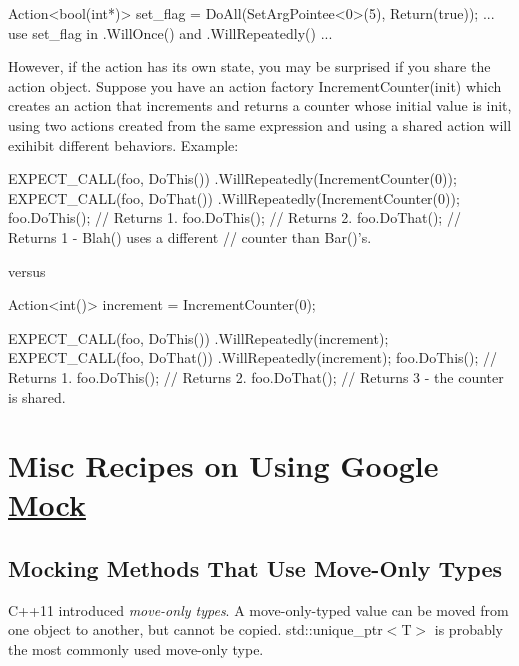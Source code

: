 \begin{DoxyCode}
Action<bool(int*)> set\_flag = DoAll(SetArgPointee<0>(5),
                                    Return(\textcolor{keyword}{true}));
... use set\_flag in .WillOnce() and .WillRepeatedly() ...
\end{DoxyCode}


However, if the action has its own state, you may be surprised if you share the action object. Suppose you have an action factory {\ttfamily Increment\+Counter(init)} which creates an action that increments and returns a counter whose initial value is {\ttfamily init}, using two actions created from the same expression and using a shared action will exihibit different behaviors. Example\+:


\begin{DoxyCode}
EXPECT\_CALL(foo, DoThis())
    .WillRepeatedly(IncrementCounter(0));
EXPECT\_CALL(foo, DoThat())
    .WillRepeatedly(IncrementCounter(0));
foo.DoThis();  \textcolor{comment}{// Returns 1.}
foo.DoThis();  \textcolor{comment}{// Returns 2.}
foo.DoThat();  \textcolor{comment}{// Returns 1 - Blah() uses a different}
               \textcolor{comment}{// counter than Bar()'s.}
\end{DoxyCode}


versus


\begin{DoxyCode}
Action<int()> increment = IncrementCounter(0);

EXPECT\_CALL(foo, DoThis())
    .WillRepeatedly(increment);
EXPECT\_CALL(foo, DoThat())
    .WillRepeatedly(increment);
foo.DoThis();  \textcolor{comment}{// Returns 1.}
foo.DoThis();  \textcolor{comment}{// Returns 2.}
foo.DoThat();  \textcolor{comment}{// Returns 3 - the counter is shared.}
\end{DoxyCode}


\section*{Misc Recipes on Using Google \hyperlink{classMock}{Mock}}

\subsection*{Mocking Methods That Use Move-\/\+Only Types}

C++11 introduced {\itshape move-\/only types}. A move-\/only-\/typed value can be moved from one object to another, but cannot be copied. {\ttfamily std\+::unique\+\_\+ptr$<$T$>$} is probably the most commonly used move-\/only type.

